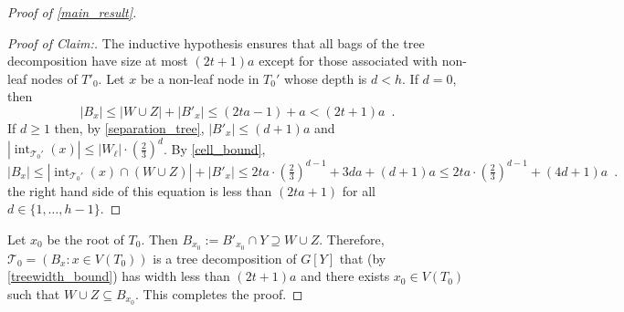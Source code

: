 \documentclass{patmorin}
\newenvironment{clmproof}{\begin{proof}[Proof of Claim:]\renewcommand{\qedsymbol}{\rule{1ex}{1ex}}}{\end{proof}}
\DeclareMathOperator{\interior}{int}
\begin{document}
\begin{proof}[Proof of \cref{main_result}]

 \begin{clmproof}
    The inductive hypothesis ensures that all bags of the tree decomposition have size at most $(2t+1)a$ except for those associated with non-leaf nodes of $T'_0$.
    Let $x$ be a non-leaf node in $T_0'$ whose depth is $d<h$. If $d=0$, then
    \[
      |B_x| \le |W\cup Z| + |B'_x| \le (2ta-1)+a < (2t+1)a \enspace .
    \]
    If $d\ge 1$ then, by \cref{separation_tree}, $|B'_x|\le (d+1)a$ and $|\interior_{\mathcal{T}_0'}(x)|\le |W_\ell|\cdot(\tfrac{2}{3})^{d}$.
    By \cref{cell_bound},
    \[
      |B_x| \le |\interior_{\mathcal{T}_0'}(x)\cap (W\cup Z)| + |B'_x|
      \le 2ta  \cdot (\tfrac{2}{3})^{d-1}+3da + (d+1)a
      \le 2ta\cdot (\tfrac{2}{3})^{d-1}+(4d+1)a \enspace .
    \]
    the right hand side of this equation is less than $(2ta+1)$ for all $d\in\{1,\ldots,h-1\}$.
  \end{clmproof}
  Let $x_0$ be the root of $T_0$. Then $B_{x_0}:=B'_{x_0}\cap Y\supseteq W\cup Z$.  Therefore, $\mathcal{T}_0=(B_x:x\in V(T_0))$ is a tree decomposition of $G[Y]$ that (by \cref{treewidth_bound}) has width less than $(2t+1)a$ and there exists $x_0\in V(T_0)$ such that $W\cup Z\subseteq B_{x_0}$.  This completes the proof.
\end{proof}




\end{document}
